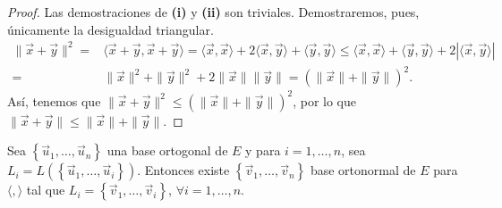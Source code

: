 \begin{proof}
Las demostraciones de \textbf{(i)} y \textbf{(ii)} son triviales. Demostraremos, pues, únicamente la desigualdad triangular. 
\[
\begin{split}
	\| \vec{x} + \vec{y}\|^{2} = & \langle \vec{x} + \vec{y}, \vec{x} +\vec{y} \rangle = \langle \vec{x}, \vec{x} \rangle + 2 \langle \vec{x}, \vec{y} \rangle + \langle \vec{y}, \vec{y} \rangle \leq \langle\vec{x}, \vec{x}\rangle + \langle \vec{y}, \vec{y} \rangle + 2 \left|\langle\vec{x}, \vec{y}\rangle \right| \\
	= & \|\vec{x}\|^{2} + \|\vec{y}\|^{2} +2\|\vec{x}\|\|\vec{y}\| = \left(\|\vec{x}\| + \|\vec{y}\|\right)^{2}.
\end{split}
\]
Así, tenemos que $\displaystyle \|\vec{x}+\vec{y}\|^{2} \leq \left(\|\vec{x}\| + \|\vec{y}\|\right)^{2} $, por lo que $\displaystyle \|\vec{x} + \vec{y}\| \leq \| \vec{x} \| + \|\vec{y}\| $.
\end{proof}
\begin{ftheorem}
	\normalfont Sea $\displaystyle \left\{ \vec{u}_{1}, \ldots, \vec{u}_{n}\right\}  $ una base ortogonal de $\displaystyle E $ y para $\displaystyle i = 1, \ldots, n $, sea $\displaystyle L_{i} = L\left( \left\{ \vec{u}_{1}, \ldots, \vec{u}_{i}\right\} \right) $. Entonces existe $\displaystyle \left\{ \vec{v}_{1}, \ldots, \vec{v}_{n}\right\}  $ base ortonormal de $\displaystyle E $ para $\displaystyle \langle, \rangle  $ tal que $\displaystyle L_{i} = \left\{ \vec{v}_{1}, \ldots, \vec{v}_{i}\right\}  $, $\displaystyle \forall i = 1, \ldots, n $.
\end{ftheorem}
